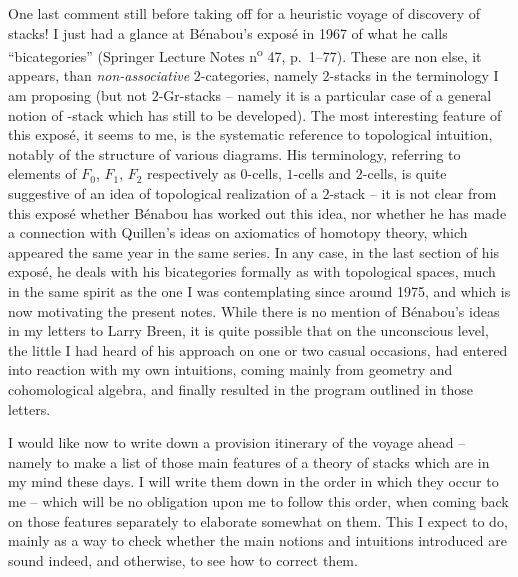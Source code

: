 One last comment still before taking off for a heuristic voyage of
discovery of stacks! I just had a glance at B\'enabou's expos\'e in
1967 of what he calls ``bicategories'' (Springer Lecture Notes
n\textsuperscript{o} 47, p.\ 1--77). These are non else, it appears,
than \emph{non-associative} $2$-categories, namely $2$-stacks in the
terminology I am proposing (but not $2$-Gr-stacks -- namely it is a
particular case of a general notion of \oo-stack which has still to be
developed). The most interesting feature of this expos\'e, it seems to
me, is the systematic reference to topological intuition, notably of
the structure of various diagrams. His terminology, referring to
elements of $F_0$, $F_1$, $F_2$ respectively as $0$-cells, $1$-cells
and $2$-cells, is quite suggestive of an idea of topological
realization of a $2$-stack -- it is not clear from this expos\'e
whether B\'enabou has worked out this idea, nor whether he has made a
connection with Quillen's ideas on axiomatics of homotopy theory,
which appeared the same year in the same series. In any case, in the
last section of his expos\'e, he deals with his bicategories formally
as with topological spaces, much in the same spirit as the one I was
contemplating since around 1975, and which is now motivating the
present notes. While there is no mention of B\'enabou's ideas in my
letters to Larry Breen, it is quite possible that on the unconscious
level, the little I had heard of his approach on one or two casual
occasions, had entered into reaction with my own intuitions, coming
mainly from geometry and cohomological algebra, and finally resulted
in the program outlined in those letters.

\clearpage

\label{sec:19}%
I would like now to write down a provision itinerary of
the voyage ahead -- namely to make a list of those main features of a
theory of stacks which are in my mind these days. I will write them
down in the order in which they occur to me -- which will be no
obligation upon me to follow this order, when coming back on those
features separately to elaborate somewhat on them. This I expect to
do, mainly as a way to check whether the main notions and intuitions
introduced are sound indeed, and otherwise, to see how to correct
them.


